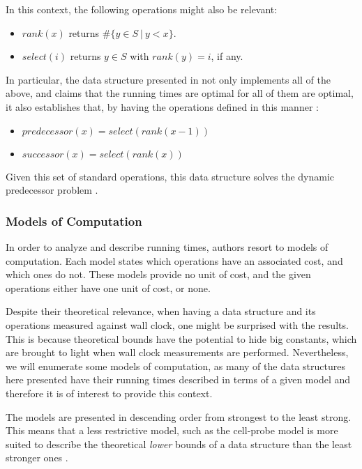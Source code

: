 In this context, the following operations might also be relevant:
\begin{itemize}
    \item
    $rank(x)$ returns $\#\{ y \in S\ |\ y < x\}$.
    \item
    $select(i)$ returns $y \in S$ with $rank(y) = i$, if any.
\end{itemize}

In particular, the data structure presented in \cite{patrascu2014dynamic} not only implements all of the above, and claims that the running times are optimal for all of them are optimal, it also establishes that, by having the operations defined in this manner \cite{patrascu2014dynamic}:
\begin{itemize}
    \item
    $predecessor(x) = select(rank(x - 1))$
    \item
    $successor(x) = select(rank(x))$
\end{itemize}

Given this set of standard operations, this data structure solves the dynamic predecessor problem \cite{beame1999optimal}.

\subsubsection{Models of Computation}\label{sec:modelsofcomputation}

In order to analyze and describe running times, authors resort to models of computation. Each model states which operations have an associated cost, and which ones do not.
These models provide no unit of cost, and the given operations either have one unit of cost, or none.

Despite their theoretical relevance, when having a data structure and its operations measured against wall clock, one might be surprised with the results.
This is because theoretical bounds have the potential to hide big constants, which are brought to light when wall clock measurements are performed.
Nevertheless, we will enumerate some models of computation, as many of the data structures here presented have their running times described in terms of a given model and therefore it is of interest to provide this context.

The models are presented in descending order from strongest to the least strong. This means that a less restrictive model, such as the cell-probe model is more suited to describe the theoretical \emph{lower} bounds of a data structure than the least stronger ones \cite{erikdemainelec11}.

